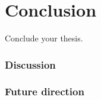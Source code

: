 \chapter[Conclusion]{Conclusion}
\label{Chap:Conclusion}
\pagestyle{headings}
Conclude your thesis.
\subsection{Discussion}
\subsection{Future direction}
% 

% 